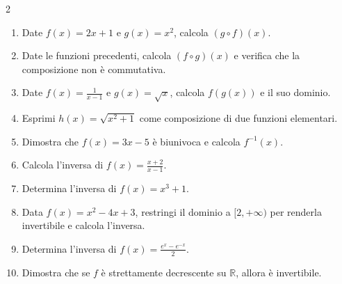 \begin{multicols}{2}
\begin{enumerate}
    \item {} Date $f(x)=2x+1$ e $g(x)=x^2$, calcola $(g \circ f)(x)$.
    \item {} Date le funzioni precedenti, calcola $(f \circ g)(x)$ e verifica che la composizione non è commutativa.
    \item {} Date $f(x)=\frac{1}{x-1}$ e $g(x)=\sqrt{x}$, calcola $f(g(x))$ e il suo dominio.
    \item {} Esprimi $h(x) = \sqrt{x^2+1}$ come composizione di due funzioni elementari.
    \item {} Dimostra che $f(x) = 3x - 5$ è biunivoca e calcola $f^{-1}(x)$.
    \item {} Calcola l'inversa di $f(x) = \frac{x+2}{x-1}$.
    \item {} Determina l'inversa di $f(x) = x^3 + 1$.
    \item {} Data $f(x) = x^2 - 4x + 3$, restringi il dominio a $[2, +\infty)$ per renderla invertibile e calcola l'inversa.
    \item {} Determina l'inversa di $f(x) = \frac{e^x - e^{-x}}{2}$.
    \item {} Dimostra che se $f$ è strettamente decrescente su $\mathbb{R}$, allora è invertibile.
\end{enumerate}
\end{multicols}

